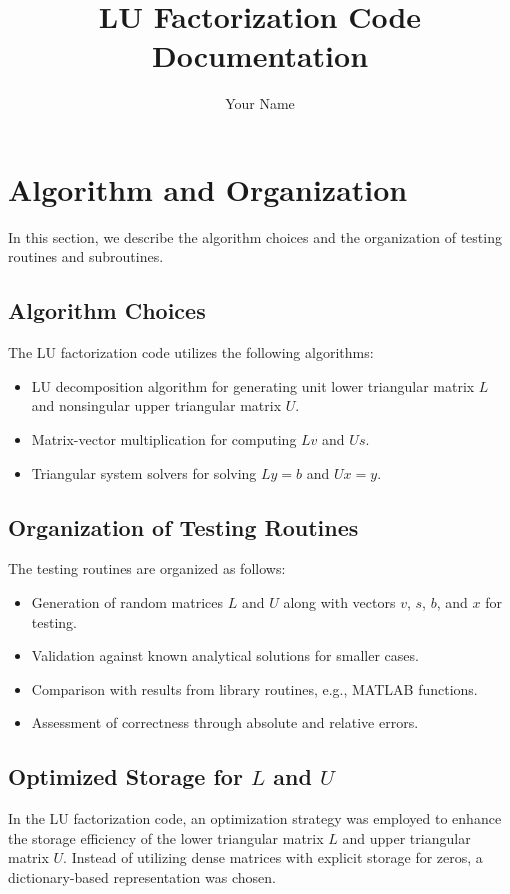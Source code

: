 \documentclass{article}
\title{LU Factorization Code Documentation}
\author{Your Name}
\begin{document}
\maketitle

\section{Algorithm and Organization}
In this section, we describe the algorithm choices and the organization of testing routines and subroutines.

\subsection{Algorithm Choices}
The LU factorization code utilizes the following algorithms:
\begin{itemize}
    \item LU decomposition algorithm for generating unit lower triangular matrix $L$ and nonsingular upper triangular matrix $U$.
    \item Matrix-vector multiplication for computing $Lv$ and $Us$.
    \item Triangular system solvers for solving $Ly = b$ and $Ux = y$.
\end{itemize}

\subsection{Organization of Testing Routines}
The testing routines are organized as follows:
\begin{itemize}
    \item Generation of random matrices $L$ and $U$ along with vectors $v$, $s$, $b$, and $x$ for testing.
    \item Validation against known analytical solutions for smaller cases.
    \item Comparison with results from library routines, e.g., MATLAB functions.
    \item Assessment of correctness through absolute and relative errors.
\end{itemize}

\subsection{Optimized Storage for $L$ and $U$}
In the LU factorization code, an optimization strategy was employed to enhance the storage efficiency of the lower triangular matrix $L$ and upper triangular matrix $U$. Instead of utilizing dense matrices with explicit storage for zeros, a dictionary-based representation was chosen.
\end{document}
